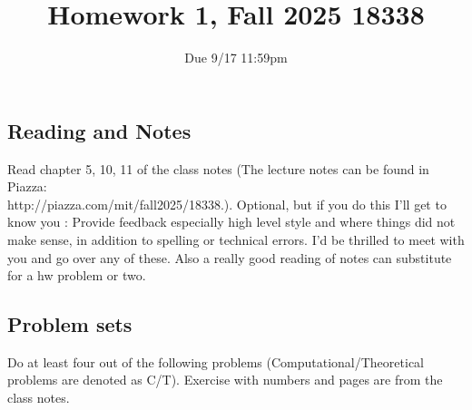 \documentclass{article}
\title{Homework 1, Fall 2025 18338}
\author{Due 9/17 11:59pm}
\date{}
\begin{document}
\maketitle


\subsection*{Reading and Notes}

Read chapter 5, 10, 11 of the class notes
(The lecture notes  can be found in  Piazza: \\  http://piazza.com/mit/fall2025/18338.). 
Optional, but if you do this I'll get to know you : Provide  feedback especially high level style and where things did not make sense, in addition to spelling or technical errors.
I'd be thrilled to meet with you and go over any of these.  Also a really
good reading of notes can substitute for a hw problem or two.


\subsection*{Problem sets}
Do at least four out of the following problems (Computational/Theoretical problems are denoted as C/T). Exercise with numbers and pages are from the class notes.
\end{document}
